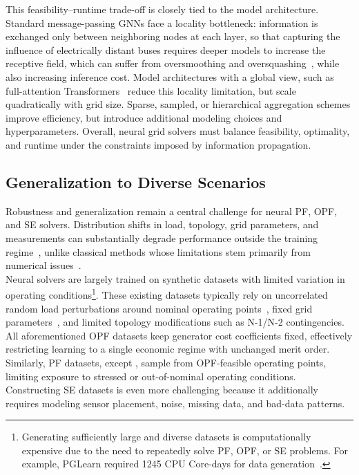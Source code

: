 This feasibility--runtime trade-off is closely tied to the model architecture. Standard message-passing GNNs face a locality bottleneck: information is exchanged only between neighboring nodes at each layer, so that capturing the influence of electrically distant buses requires deeper models to increase the receptive field, which can suffer from oversmoothing and oversquashing~\cite{gnnreview, liu2022graph}, while also increasing inference cost. Model architectures with a global view, such as full-attention Transformers~\cite{vaswani2017attention, gps} reduce this locality limitation, but scale quadratically with grid size. Sparse, sampled, or hierarchical aggregation schemes improve efficiency, but introduce additional modeling choices and hyperparameters. Overall, neural grid solvers must balance feasibility, optimality, and runtime under the constraints imposed by information propagation.

\subsection{Generalization to Diverse Scenarios}

Robustness and generalization remain a central challenge for neural PF, OPF, and SE solvers. Distribution shifts in load, topology, grid parameters, and measurements can substantially degrade performance outside the training regime~\cite{NEURIPS2025_d000ef56}, unlike classical methods whose limitations stem primarily from numerical issues~\cite{tostado2021solving}.
\\

Neural solvers are largely trained on synthetic datasets with limited variation in operating conditions\footnote{Generating sufficiently large and diverse datasets is computationally expensive due to the need to repeatedly solve PF, OPF, or SE problems. For example, PGLearn required 1245 CPU Core-days for data generation~\cite{pglearn}.}. These existing datasets typically rely on uncorrelated random load perturbations around nominal operating points~\cite{lovett2024opfdatalargescaledatasetsac,varbella2024powergraph,lin2024powerflownet,LOPEZGARCIA2023105567,DONON2020106547}, fixed grid parameters~\cite{opflearn,NEURIPS2025_d000ef56,pglearn,lovett2024opfdatalargescaledatasetsac,varbella2024powergraph}, and limited topology modifications such as N-1/N-2 contingencies. All aforementioned OPF datasets keep generator cost coefficients fixed, effectively restricting learning to a single economic regime with unchanged merit order. Similarly, PF datasets, except \pfdelta, sample from OPF-feasible operating points, limiting exposure to stressed or out-of-nominal operating conditions. Constructing SE datasets is even more challenging because it additionally requires modeling sensor placement, noise, missing data, and bad-data patterns. \\

